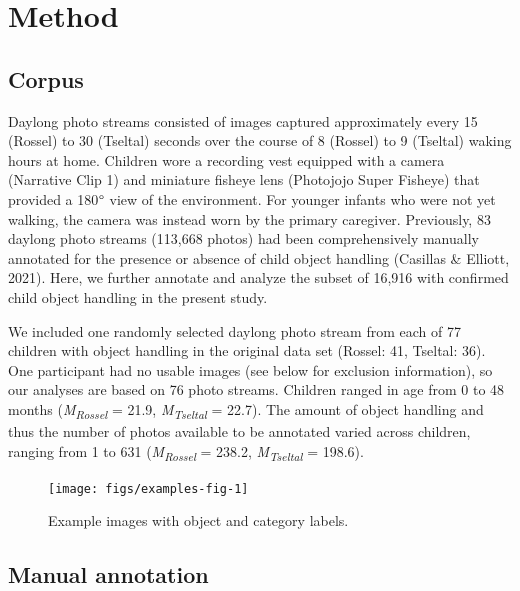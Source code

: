 \documentclass[10pt, letterpaper]{article}
\newenvironment{CodeChunk}{}{}
\begin{document}
\hypertarget{method}{%
\section{Method}\label{method}}

\hypertarget{corpus}{%
\subsection{Corpus}\label{corpus}}

Daylong photo streams consisted of images captured approximately every
15 (Rossel) to 30 (Tseltal) seconds over the course of 8 (Rossel) to 9
(Tseltal) waking hours at home. Children wore a recording vest equipped
with a camera (Narrative Clip 1) and miniature fisheye lens (Photojojo
Super Fisheye) that provided a 180\(\text{\textdegree}\) view of the
environment. For younger infants who were not yet walking, the camera
was instead worn by the primary caregiver. Previously, 83 daylong photo
streams (113,668 photos) had been comprehensively manually annotated for
the presence or absence of child object handling (Casillas \& Elliott,
2021). Here, we further annotate and analyze the subset of 16,916 with
confirmed child object handling in the present study.

We included one randomly selected daylong photo stream from each of 77
children with object handling in the original data set (Rossel: 41,
Tseltal: 36). One participant had no usable images (see below for
exclusion information), so our analyses are based on 76 photo streams.
Children ranged in age from 0 to 48 months
(\emph{M}\textsubscript{\emph{Rossel}} = 21.9,
\emph{M}\textsubscript{\emph{Tseltal}} = 22.7). The amount of object
handling and thus the number of photos available to be annotated varied
across children, ranging from 1 to 631
(\emph{M}\textsubscript{\emph{Rossel}} = 238.2,
\emph{M}\textsubscript{\emph{Tseltal}} = 198.6).

\begin{CodeChunk}
\begin{figure}[h]

{\centering \texttt{[image: figs/examples-fig-1]} 

}

\caption[Example images with object and category labels]{Example images with object and category labels.}\label{fig:examples-fig}
\end{figure}
\end{CodeChunk}

\hypertarget{manual-annotation}{%
\subsection{Manual annotation}\label{manual-annotation}}
\end{document}
